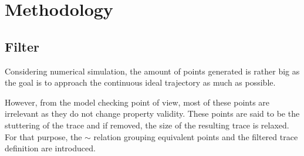 \documentclass[12pt,twoside,draft]{fithesis}
\begin{document}
\chapter{Methodology}
\section{Filter}
Considering numerical simulation, the amount of points
generated is rather big as the goal is to approach the continuous ideal
trajectory as much as possible.

However, from the model checking point of view, most of these points
are irrelevant as they do not change
property validity. These points are said to be the stuttering of the
trace\cite{lamport} and if removed, the size of the resulting trace
is relaxed. For that purpose, the $\sim$ relation grouping equivalent
points and the filtered trace definition are introduced.
\end{document}
